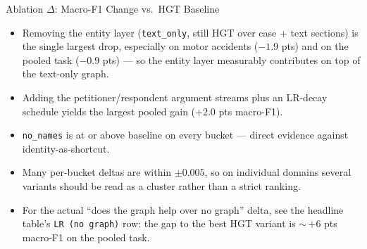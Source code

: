 \documentclass[aspectratio=169,11pt]{beamer}
\newenvironment{tightitemize}{
  \begin{itemize}
    \setlength{\itemsep}{2pt}
    \setlength{\parskip}{0pt}
}{\end{itemize}}
\begin{document}
\begin{frame}{Ablation $\Delta$: Macro-F1 Change vs.\ HGT Baseline}
  \vspace{0.6em}
  \begin{tightitemize}
    \item Removing the entity layer (\texttt{text\_only}, still HGT over case + text sections) is the single largest drop, especially on motor accidents ($-1.9$ pts) and on the pooled task ($-0.9$ pts) --- so the entity layer measurably contributes on top of the text-only graph.
    \item Adding the petitioner/respondent argument streams plus an LR-decay schedule yields the largest pooled gain ($+2.0$ pts macro-F1).
    \item \texttt{no\_names} is at or above baseline on every bucket --- direct evidence against identity-as-shortcut.
    \item Many per-bucket deltas are within $\pm 0.005$, so on individual domains several variants should be read as a cluster rather than a strict ranking.
    \item For the actual ``does the graph help over no graph'' delta, see the headline table's \texttt{LR (no graph)} row: the gap to the best HGT variant is $\sim$\,$+6$ pts macro-F1 on the pooled task.
  \end{tightitemize}
\end{frame}
\end{document}
